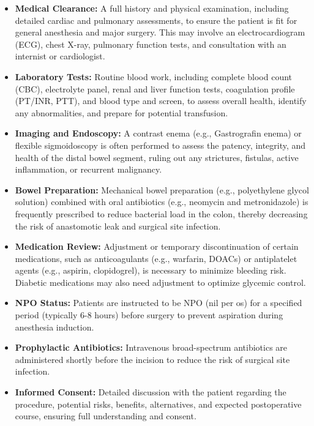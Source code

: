 \begin{itemize}
  \item \textbf{Medical Clearance:} A full history and physical examination, including detailed cardiac and pulmonary assessments, to ensure the patient is fit for general anesthesia and major surgery. This may involve an electrocardiogram (ECG), chest X-ray, pulmonary function tests, and consultation with an internist or cardiologist.
  
  \item \textbf{Laboratory Tests:} Routine blood work, including complete blood count (CBC), electrolyte panel, renal and liver function tests, coagulation profile (PT/INR, PTT), and blood type and screen, to assess overall health, identify any abnormalities, and prepare for potential transfusion.
  
  \item \textbf{Imaging and Endoscopy:} A contrast enema (e.g., Gastrografin enema) or flexible sigmoidoscopy is often performed to assess the patency, integrity, and health of the distal bowel segment, ruling out any strictures, fistulas, active inflammation, or recurrent malignancy.
  
  \item \textbf{Bowel Preparation:} Mechanical bowel preparation (e.g., polyethylene glycol solution) combined with oral antibiotics (e.g., neomycin and metronidazole) is frequently prescribed to reduce bacterial load in the colon, thereby decreasing the risk of anastomotic leak and surgical site infection.
  
  \item \textbf{Medication Review:} Adjustment or temporary discontinuation of certain medications, such as anticoagulants (e.g., warfarin, DOACs) or antiplatelet agents (e.g., aspirin, clopidogrel), is necessary to minimize bleeding risk. Diabetic medications may also need adjustment to optimize glycemic control.
  
  \item \textbf{NPO Status:} Patients are instructed to be NPO (nil per os) for a specified period (typically 6-8 hours) before surgery to prevent aspiration during anesthesia induction.
  
  \item \textbf{Prophylactic Antibiotics:} Intravenous broad-spectrum antibiotics are administered shortly before the incision to reduce the risk of surgical site infection.
  
  \item \textbf{Informed Consent:} Detailed discussion with the patient regarding the procedure, potential risks, benefits, alternatives, and expected postoperative course, ensuring full understanding and consent.
\end{itemize}

